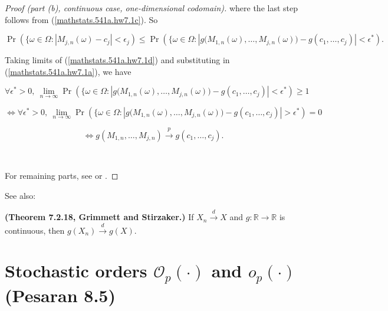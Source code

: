 \begin{proof}[Proof (part (b), continuous case, one-dimensional codomain)]
where the last step follows from (\ref{mathstats.541a.hw7.1c}). So

\begin{equation}\label{mathstats.541a.hw7.1d}
\Pr(\{\omega \in \Omega : |M_{j,n}(\omega) - c_j| < \epsilon_j)  \leq \Pr(\{\omega \in \Omega : |g\big(M_{1,n}(\omega),\ldots,M_{j,n}(\omega) \big)- g(c_1, \ldots, c_j)| < \epsilon^*).
\end{equation}

Taking limits of (\ref{mathstats.541a.hw7.1d}) and substituting in (\ref{mathstats.541a.hw7.1a}), we have

%
%
%
%

\[
\forall \epsilon^* > 0, \ \lim_{n \to \infty} \Pr(\{\omega \in \Omega : |g\big(M_{1,n}(\omega),\ldots,M_{j,n}(\omega) \big)- g(c_1, \ldots, c_j)| < \epsilon^*) \geq 1
\]

\[
\iff \forall \epsilon^* > 0, \ \lim_{n \to \infty} \Pr(\{\omega \in \Omega : |g\big(M_{1,n}(\omega),\ldots,M_{j,n}(\omega) \big)- g(c_1, \ldots, c_j)| > \epsilon^*) = 0
\]

\[
\iff g(M_{1,n},\ldots,M_{j,n}) \xrightarrow{p} g(c_{1},\ldots,c_{j}).
\]


\

For remaining parts, see \citet{serfling1980} or \citet{rao1973linear}.\end{proof}

See also: 

\begin{theorem} \label{asym.thm.7.2.18} \textbf{(Theorem 7.2.18, Grimmett and Stirzaker.)} If \(X_n \xrightarrow{d} X\) and \(g: \mathbb{R} \to \mathbb{R}\) is continuous, then \(g(X_n) \xrightarrow{d} g(X)\). \end{theorem}

\section{Stochastic orders \(\mathcal{O}_p(\cdot)\) and \(o_p(\cdot)\) (Pesaran 8.5)}

